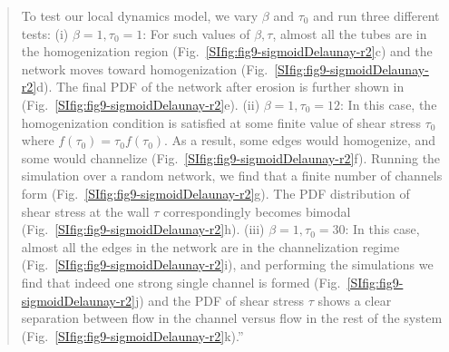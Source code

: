 \documentclass{article}
\begin{document}
{\begin{quote}
    To test our local dynamics model, we vary $\beta$ and $\tau_0$ and run three different tests: (i) $\beta=1,\tau_0=1$: For such values of $\beta,\tau$, almost all the tubes are in the homogenization region (Fig.~\ref{SIfig:fig9-sigmoidDelaunay-r2}c) and the network moves toward homogenization (Fig.~\ref{SIfig:fig9-sigmoidDelaunay-r2}d). The final PDF of the network after erosion is further shown in (Fig.~\ref{SIfig:fig9-sigmoidDelaunay-r2}e). (ii) $\beta=1, \tau_0=12$: In this case, the homogenization condition is satisfied at some finite value of shear stress $\tau_0$ where $f(\tau_0) = \tau_0 f(\tau_0)$. As a result, some edges would homogenize, and some would channelize (Fig.~\ref{SIfig:fig9-sigmoidDelaunay-r2}f). Running the simulation over a random network, we find that a finite number of channels form (Fig.~\ref{SIfig:fig9-sigmoidDelaunay-r2}g). The PDF distribution of shear stress at the wall $\tau$ correspondingly becomes bimodal (Fig.~\ref{SIfig:fig9-sigmoidDelaunay-r2}h). (iii) $\beta=1, \tau_0=30$: In this case, almost all the edges in the network are in the channelization regime  (Fig.~\ref{SIfig:fig9-sigmoidDelaunay-r2}i), and performing the simulations we find that indeed one strong single channel is formed (Fig.~\ref{SIfig:fig9-sigmoidDelaunay-r2}j) and the PDF of shear stress $\tau$ shows a clear separation between flow in the channel versus flow in the rest of the system (Fig.~\ref{SIfig:fig9-sigmoidDelaunay-r2}k).''
\end{quote}
}
\end{document}
